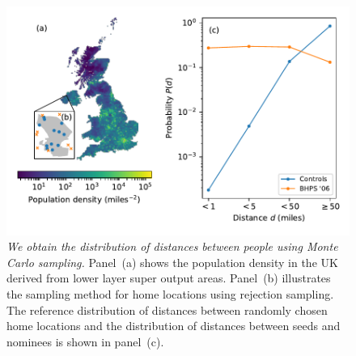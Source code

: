 \documentclass{scrartcl}
\newcommand{\titlecaption}[2]{\caption[#1]{\emph{#1} #2}}
\begin{document}
\begin{figure}
    \includegraphics{survey-distances}
    \titlecaption{We obtain the distribution of distances between people using Monte Carlo sampling.}{Panel~(a) shows the population density in the UK derived from lower layer super output areas. Panel~(b) illustrates the sampling method for home locations using rejection sampling. The reference distribution of distances between randomly chosen home locations and the distribution of distances between seeds and nominees is shown in panel~(c).\label{fig:survey-distances}}
\end{figure}
\end{document}
